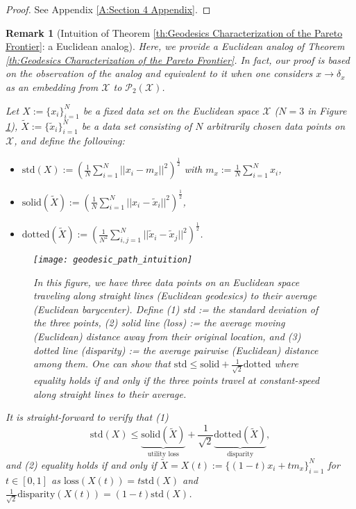 \documentclass[twoside,11pt]{article}
\newtheorem{rema}{Remark}[section]{\bfseries}{\itshape}
\begin{document}
\begin{proof}
See Appendix \ref{A:Section 4 Appendix}.
\end{proof}

\begin{rema}[Intuition of Theorem \ref{th:Geodesics Characterization of the Pareto Frontier}: a Euclidean analog]
Here, we provide a Euclidean analog of Theorem \ref{th:Geodesics Characterization of the Pareto Frontier}. In fact, our proof is based on the observation of the analog and equivalent to it when one considers $x \rightarrow \delta_{x}$ as an embedding from $\mathcal{X}$ to $\mathcal{P}_2(\mathcal{X})$.

Let $X:= \{x_i\}_{i = 1}^N$ be a fixed data set on the Euclidean space $\mathcal{X}$ ($N = 3$ in Figure \ref{geodesic_path_intuition}),  $\tilde{X} := \{\tilde{x}_i\}_{i = 1}^N$ be a data set consisting of $N$ arbitrarily chosen data points on $\mathcal{X}$, and define the following:
\begin{itemize}
\setlength{\parsep}{-0.2ex}
\setlength{\itemsep}{-0.2ex}
\item {} $\text{std}(X) := (\frac{1}{N} \sum_{i = 1}^N ||x_i - m_x||^2)^{\frac{1}{2}}$ with $m_x := \frac{1}{N} \sum_{i = 1}^N x_i$,
\item {} $\text{solid}(\tilde{X}) := (\frac{1}{N} \sum_{i = 1}^N ||x_i - \tilde{x}_i||^2)^{\frac{1}{2}}$,
\item {} $\text{dotted}(\tilde{X}) := (\frac{1}{N^2} \sum_{i,j = 1}^N ||\tilde{x}_i - \tilde{x}_j||^2)^{\frac{1}{2}}$.
\end{itemize}

\begin{figure}[H]
\centering
\texttt{[image: geodesic\_path\_intuition]}
\caption{In this figure, we have three data points on an Euclidean space traveling along straight lines (Euclidean geodesics) to their average (Euclidean barycenter). Define (1) std := the standard deviation of the three points, (2) solid line (loss) := the average moving (Euclidean) distance away from their original location, and (3) dotted line (disparity) := the average pairwise (Euclidean) distance among them. One can show that $\text{std} \leq \text{solid} + \frac{1}{\sqrt{2}} \text{dotted}$ where equality holds if and only if the three points travel at constant-speed along straight lines to their average.}
\label{geodesic_path_intuition}
\end{figure}
It is straight-forward to verify that (1) $$\text{std}(X) \leq \underbrace{\text{solid}(\tilde{X})}_{\text{utility loss}} + \frac{1}{\sqrt{2}} \underbrace{\text{dotted}(\tilde{X})}_{\text{disparity}},$$ and (2)  equality holds if and only if $\tilde{X} = X(t) := \{(1-t)x_i + tm_x\}_{i = 1}^N$ for $t \in [0,1]$ as $\text{loss}(X(t)) = t\text{std}(X)$ and $\frac{1}{\sqrt{2}}\text{disparity}(X(t)) = (1-t)\text{std}(X)$.
\end{rema}
\end{document}
